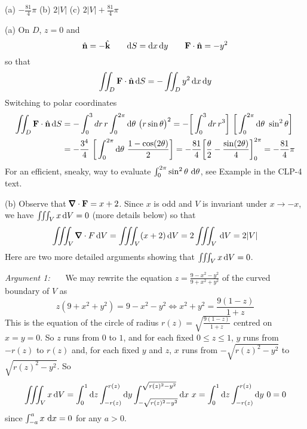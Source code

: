 \begin{answer}
(a) $-\frac{81}{4}\pi$\qquad 
(b) $2|V|$ \qquad
(c) $2|V|+\frac{81}{4}\pi$
\end{answer}

\begin{solution} 
(a)
On $D$, $z=0$ and
\begin{equation*}
\hat{\mathbf{n}}=-\hat{\mathbf{k}}\qquad
\mathrm{d}S=\mathrm{d}x\,\mathrm{d}y\qquad 
\mathbf{F}\cdot\hat{\mathbf{n}}=-y^2
\end{equation*}
so that
\begin{equation*}
\iint_{D}\mathbf{F}\cdot \hat{\mathbf{n}}\,\mathrm{d}S
=-\iint_D y^2\,\mathrm{d}x\,\mathrm{d}y
\end{equation*}
Switching to polar coordinates
\begin{align*}
\dblInt_{D}\vF\cdot \hn\,\dee{S}
&=-\int_0^3 dr\,r\int_0^{2\pi}\dee{\theta}\ \big(r\sin\theta\big)^2
=-\bigg[\int_0^3 dr\,r^3\bigg]\ \bigg[\int_0^{2\pi}\dee{\theta}\ \sin^2\theta\bigg]\\
&=-\frac{3^4}{4}\ \bigg[\int_0^{2\pi}\dee{\theta}\ \frac{1-\cos(2\theta)}{2}\bigg]
=-\frac{81}{4}\bigg[\frac{\theta}{2}-\frac{\sin(2\theta)}{4}\bigg]_0^{2\pi}
=-\frac{81}{4}\pi
\end{align*}
For an efficient, sneaky, way to evaluate 
$\int_0^{2\pi} \sin^2 \theta\ \mathrm{d}\theta$, see Example
 in the CLP-4 text.

(b)
Observe that $\vnabla\cdot \vF=x+2$. Since $x$ is odd and $V$ is invariant
under $x\rightarrow -x$, we have $\iiint_V x\,\mathrm{d}V=0$ (more details
below) so that
\begin{equation*}
\tripInt_V\vnabla\cdot F\,\dee{V}
=\tripInt_V (x+2)\,\dee{V}
=2\tripInt_V \,\dee{V}
=2|V|
\end{equation*}
Here are two more detailed arguments showing that $\iiint_V x\,\mathrm{d}V=0$.

\emph{Argument 1:} \ \ \ We may rewrite the equation 
$z=\frac{9-x^2-y^2}{9+x^2+y^2}$ of the curved boundary of $V$
as
\begin{equation*}
z(9+x^2+y^2) = 9-x^2-y^2 \iff
x^2+y^2 = \frac{9(1-z)}{1+z}
\end{equation*}
This is the equation of the circle of radius 
$r(z)=\sqrt{\frac{9(1-z)}{1+z}}$ centred on $x=y=0$.
So $z$ runs from $0$ to $1$, and for each fixed $0\le z\le 1$,
$y$ runs from  $-r(z)$ to $r(z)$
and, for each fixed $y$ and $z$, $x$ runs from $-\sqrt{r(z)^2-y^2}$
to $\sqrt{r(z)^2-y^2}$. So
\begin{align*}
\iiint_V x\,\mathrm{d}V
=\int_0^1 \mathrm{d}z\int_{-r(z)}^{r(z)}\mathrm{d}y
       \int_{-\sqrt{r(z)^2-y^2}}^{\sqrt{r(z)^2-y^2}} \mathrm{d}x\ x
=\int_0^1 \mathrm{d}z\int_{-r(z)}^{r(z)}\mathrm{d}y\ 0
=0
\end{align*}
since $\int_{-a}^a x\ \dee{x}=0$ for any $a>0$.


\end{solution}
